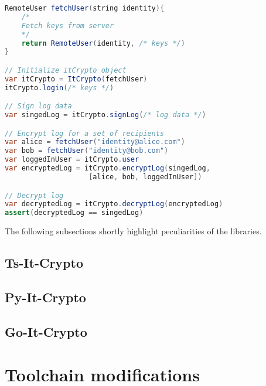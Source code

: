 \documentclass[../main.tex]{subfiles}
\begin{document}
\begin{lstlisting}[label=lst:pseudocode,float,floatplacement=tbp, language=Java, caption={Pseudocode of creating, encrypting and decrypting logs using the provided libraries.}, morekeywords={RemoteUser, var, assert}, commentstyle=\color{codegreen}]
RemoteUser fetchUser(string identity){
    /*
    Fetch keys from server
    */
    return RemoteUser(identity, /* keys */)
}

// Initialize itCrypto object
var itCrypto = ItCrypto(fetchUser)
itCrypto.login(/* keys */)

// Sign log data
var singedLog = itCrypto.signLog(/* log data */)

// Encrypt log for a set of recipients
var alice = fetchUser("identity@alice.com")
var bob = fetchUser("identity@bob.com")
var loggedInUser = itCrypto.user
var encryptedLog = itCrypto.encryptLog(singedLog, 
                    [alice, bob, loggedInUser])

// Decrypt log
var decryptedLog = itCrypto.decryptLog(encryptedLog)
assert(decryptedLog == singedLog)
\end{lstlisting}

The following subsections shortly highlight peculiarities of the libraries.

\subsection{Ts-It-Crypto}

\subsection{Py-It-Crypto}

\subsection{Go-It-Crypto}

\section{Toolchain modifications}
\label{sec:toolchain-modifications}
\end{document}
